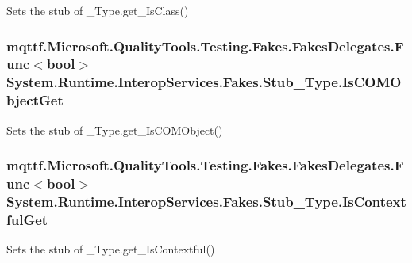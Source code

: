 Sets the stub of \-\_\-\-Type.\-get\-\_\-\-Is\-Class()

\hypertarget{class_system_1_1_runtime_1_1_interop_services_1_1_fakes_1_1_stub___type_abe0a24b234453059c3bfb9f51132f8a5}{
\subsubsection[{Is\-C\-O\-M\-Object\-Get}]{\setlength{\rightskip}{0pt plus 5cm}mqttf.\-Microsoft.\-Quality\-Tools.\-Testing.\-Fakes.\-Fakes\-Delegates.\-Func$<$bool$>$ System.\-Runtime.\-Interop\-Services.\-Fakes.\-Stub\-\_\-\-Type.\-Is\-C\-O\-M\-Object\-Get}}\label{class_system_1_1_runtime_1_1_interop_services_1_1_fakes_1_1_stub___type_abe0a24b234453059c3bfb9f51132f8a5}


Sets the stub of \-\_\-\-Type.\-get\-\_\-\-Is\-C\-O\-M\-Object()

\hypertarget{class_system_1_1_runtime_1_1_interop_services_1_1_fakes_1_1_stub___type_a9d04c0c6ee8a890f7c0e8d4c25ee04db}{
\subsubsection[{Is\-Contextful\-Get}]{\setlength{\rightskip}{0pt plus 5cm}mqttf.\-Microsoft.\-Quality\-Tools.\-Testing.\-Fakes.\-Fakes\-Delegates.\-Func$<$bool$>$ System.\-Runtime.\-Interop\-Services.\-Fakes.\-Stub\-\_\-\-Type.\-Is\-Contextful\-Get}}\label{class_system_1_1_runtime_1_1_interop_services_1_1_fakes_1_1_stub___type_a9d04c0c6ee8a890f7c0e8d4c25ee04db}


Sets the stub of \-\_\-\-Type.\-get\-\_\-\-Is\-Contextful()

